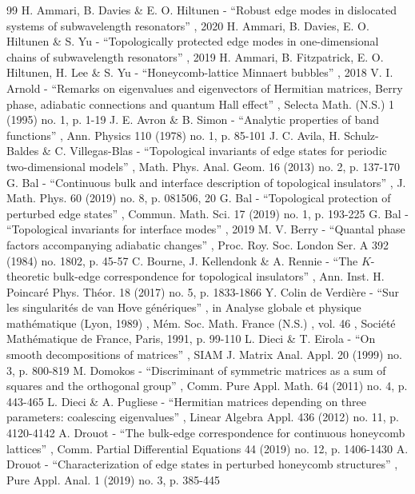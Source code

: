 \begin{thebibliography}{99}
 H. Ammari, B. Davies \& E. O. Hiltunen - “Robust edge modes in dislocated systems of subwavelength resonators” , 2020
 H. Ammari, B. Davies, E. O. Hiltunen \& S. Yu - “Topologically protected edge modes in one-dimensional chains of subwavelength resonators” , 2019
 H. Ammari, B. Fitzpatrick, E. O. Hiltunen, H. Lee \& S. Yu - “Honeycomb-lattice Minnaert bubbles” , 2018
 V. I. Arnold - “Remarks on eigenvalues and eigenvectors of Hermitian matrices, Berry phase, adiabatic connections and quantum Hall effect” , Selecta Math. (N.S.) 1 (1995) no. 1, p. 1-19
 J. E. Avron \& B. Simon - “Analytic properties of band functions” , Ann. Physics 110 (1978) no. 1, p. 85-101
 J. C. Avila, H. Schulz-Baldes \& C. Villegas-Blas - “Topological invariants of edge states for periodic two-dimensional models” , Math. Phys. Anal. Geom. 16 (2013) no. 2, p. 137-170
 G. Bal - “Continuous bulk and interface description of topological insulators” , J. Math. Phys. 60 (2019) no. 8, p. 081506, 20
 G. Bal - “Topological protection of perturbed edge states” , Commun. Math. Sci. 17 (2019) no. 1, p. 193-225
 G. Bal - “Topological invariants for interface modes” , 2019
 M. V. Berry - “Quantal phase factors accompanying adiabatic changes” , Proc. Roy. Soc. London Ser. A 392 (1984) no. 1802, p. 45-57
 C. Bourne, J. Kellendonk \& A. Rennie - “The $K$-theoretic bulk-edge correspondence for topological insulators” , Ann. Inst. H. Poincaré Phys. Théor. 18 (2017) no. 5, p. 1833-1866
 Y. Colin de Verdière - “Sur les singularités de van Hove génériques” , in Analyse globale et physique mathématique (Lyon, 1989) , Mém. Soc. Math. France (N.S.) , vol. 46 , Société Mathématique de France, Paris, 1991, p. 99-110
 L. Dieci \& T. Eirola - “On smooth decompositions of matrices” , SIAM J. Matrix Anal. Appl. 20 (1999) no. 3, p. 800-819
 M. Domokos - “Discriminant of symmetric matrices as a sum of squares and the orthogonal group” , Comm. Pure Appl. Math. 64 (2011) no. 4, p. 443-465
 L. Dieci \& A. Pugliese - “Hermitian matrices depending on three parameters: coalescing eigenvalues” , Linear Algebra Appl. 436 (2012) no. 11, p. 4120-4142
 A. Drouot - “The bulk-edge correspondence for continuous honeycomb lattices” , Comm. Partial Differential Equations 44 (2019) no. 12, p. 1406-1430
 A. Drouot - “Characterization of edge states in perturbed honeycomb structures” , Pure Appl. Anal. 1 (2019) no. 3, p. 385-445

\end{thebibliography}
